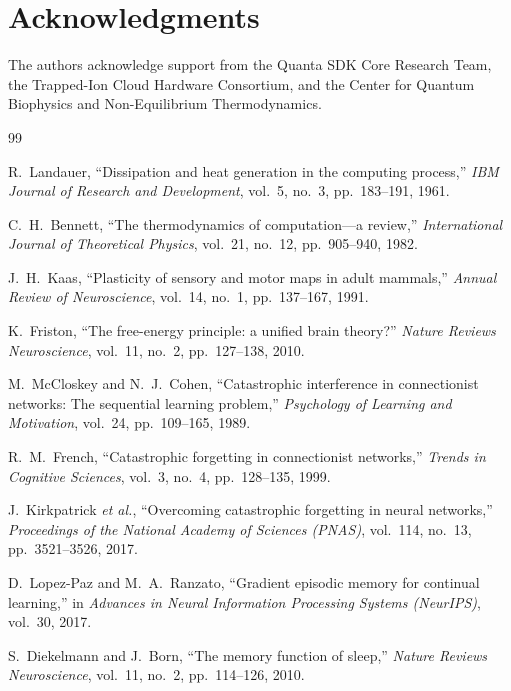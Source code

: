 \documentclass[10pt,twocolumn,3p]{article}
\begin{document}
\section*{Acknowledgments}
The authors acknowledge support from the Quanta SDK Core Research Team, the Trapped-Ion Cloud Hardware Consortium, and the Center for Quantum Biophysics and Non-Equilibrium Thermodynamics.

\begin{thebibliography}{99}

R.~Landauer,
``Dissipation and heat generation in the computing process,''
\textit{IBM Journal of Research and Development}, vol.~5, no.~3, pp.~183--191, 1961.

C.~H.~Bennett,
``The thermodynamics of computation---a review,''
\textit{International Journal of Theoretical Physics}, vol.~21, no.~12, pp.~905--940, 1982.

J.~H.~Kaas,
``Plasticity of sensory and motor maps in adult mammals,''
\textit{Annual Review of Neuroscience}, vol.~14, no.~1, pp.~137--167, 1991.

K.~Friston,
``The free-energy principle: a unified brain theory?''
\textit{Nature Reviews Neuroscience}, vol.~11, no.~2, pp.~127--138, 2010.

M.~McCloskey and N.~J.~Cohen,
``Catastrophic interference in connectionist networks: The sequential learning problem,''
\textit{Psychology of Learning and Motivation}, vol.~24, pp.~109--165, 1989.

R.~M.~French,
``Catastrophic forgetting in connectionist networks,''
\textit{Trends in Cognitive Sciences}, vol.~3, no.~4, pp.~128--135, 1999.

J.~Kirkpatrick \textit{et al.},
``Overcoming catastrophic forgetting in neural networks,''
\textit{Proceedings of the National Academy of Sciences (PNAS)}, vol.~114, no.~13, pp.~3521--3526, 2017.

D.~Lopez-Paz and M.~A.~Ranzato,
``Gradient episodic memory for continual learning,''
in \textit{Advances in Neural Information Processing Systems (NeurIPS)}, vol.~30, 2017.

S.~Diekelmann and J.~Born,
``The memory function of sleep,''
\textit{Nature Reviews Neuroscience}, vol.~11, no.~2, pp.~114--126, 2010.


\end{thebibliography}
\end{document}
